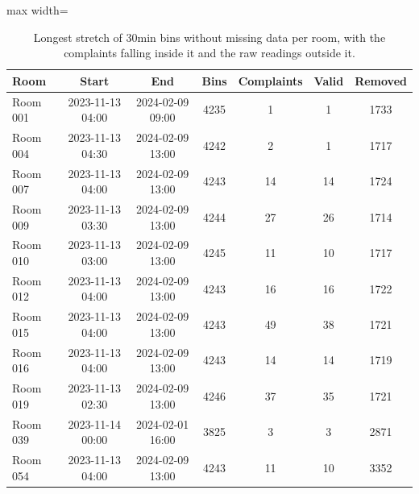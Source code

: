 \begin{table}[ht]
\centering
\begin{adjustbox}{max width=\textwidth}
\begin{tabular}{lcccccc}
\hline
Room & Start & End & Bins & Complaints & Valid & Removed \\
\hline
Room 001 & 2023-11-13 04:00 & 2024-02-09 09:00 & 4235 & 1 & 1 & 1733 \\
Room 004 & 2023-11-13 04:30 & 2024-02-09 13:00 & 4242 & 2 & 1 & 1717 \\
Room 007 & 2023-11-13 04:00 & 2024-02-09 13:00 & 4243 & 14 & 14 & 1724 \\
Room 009 & 2023-11-13 03:30 & 2024-02-09 13:00 & 4244 & 27 & 26 & 1714 \\
Room 010 & 2023-11-13 03:00 & 2024-02-09 13:00 & 4245 & 11 & 10 & 1717 \\
Room 012 & 2023-11-13 04:00 & 2024-02-09 13:00 & 4243 & 16 & 16 & 1722 \\
Room 015 & 2023-11-13 04:00 & 2024-02-09 13:00 & 4243 & 49 & 38 & 1721 \\
Room 016 & 2023-11-13 04:00 & 2024-02-09 13:00 & 4243 & 14 & 14 & 1719 \\
Room 019 & 2023-11-13 02:30 & 2024-02-09 13:00 & 4246 & 37 & 35 & 1721 \\
Room 039 & 2023-11-14 00:00 & 2024-02-01 16:00 & 3825 & 3 & 3 & 2871 \\
Room 054 & 2023-11-13 04:00 & 2024-02-09 13:00 & 4243 & 11 & 10 & 3352 \\
\hline
\end{tabular}
\end{adjustbox}
\caption{Longest stretch of 30min bins without missing data per room, with the complaints falling inside it and the raw readings outside it.}
\label{tab:longest_complete_run}
\end{table}
